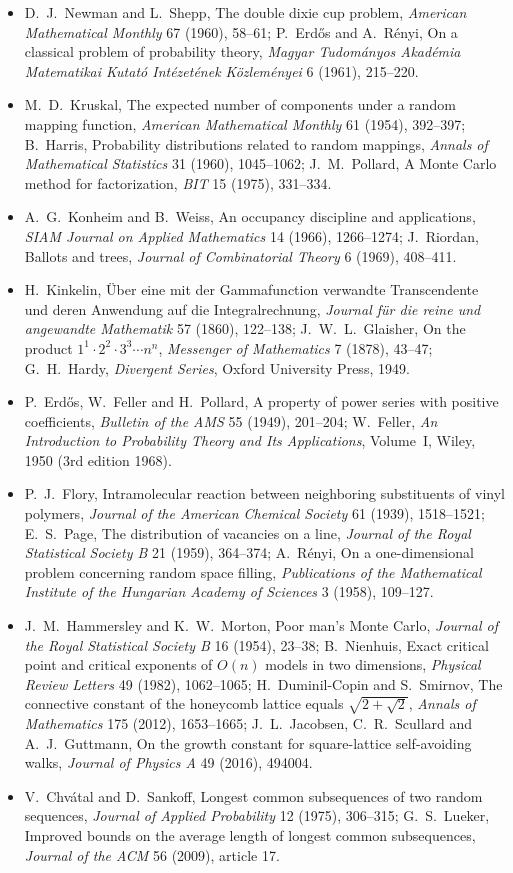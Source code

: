 \begin{itemize}
\item D.~J.~Newman and L.~Shepp, The double dixie cup problem, \emph{American Mathematical Monthly} 67 (1960), 58--61; P.~Erd\H os and A.~R\'enyi, On a classical problem of probability
theory, \emph{Magyar Tudom\'anyos Akad\'emia Matematikai Kutat\'o Int\'ezet\'enek K\"ozlem\'enyei} 6 (1961), 215--220.
\item M.~D.~Kruskal, The expected number of components under a random mapping function, \emph{American Mathematical Monthly} 61 (1954), 392--397; B.~Harris, Probability distributions
related to random mappings, \emph{Annals of Mathematical Statistics} 31 (1960), 1045--1062; J.~M.~Pollard, A Monte Carlo method for factorization, \emph{BIT} 15 (1975), 331--334.
\item A.~G.~Konheim and B.~Weiss, An occupancy discipline and applications, \emph{SIAM Journal on Applied Mathematics} 14 (1966), 1266--1274; J.~Riordan, Ballots and trees, \emph{Journal of
Combinatorial Theory} 6 (1969), 408--411.
\item H.~Kinkelin, \"Uber eine mit der Gammafunction verwandte Transcendente und deren Anwendung auf die Integralrechnung, \emph{Journal f\"ur die reine und angewandte Mathematik} 57
(1860), 122--138; J.~W.~L.~Glaisher, On the product $1^1\cdot2^2\cdot3^3\cdots n^n$, \emph{Messenger of Mathematics} 7 (1878), 43--47; G.~H.~Hardy, \emph{Divergent Series}, Oxford University Press,
1949.
\item P.~Erd\H os, W.~Feller and H.~Pollard, A property of power series with positive coefficients, \emph{Bulletin of the AMS} 55 (1949), 201--204; W.~Feller, \emph{An Introduction to
Probability Theory and Its Applications}, Volume~I, Wiley, 1950 (3rd edition 1968).
\item P.~J.~Flory, Intramolecular reaction between neighboring substituents of vinyl polymers, \emph{Journal of the American Chemical Society} 61 (1939), 1518--1521; E.~S.~Page, The
distribution of vacancies on a line, \emph{Journal of the Royal Statistical Society B} 21 (1959), 364--374; A.~R\'enyi, On a one-dimensional problem concerning random space filling,
\emph{Publications of the Mathematical Institute of the Hungarian Academy of Sciences} 3 (1958), 109--127.
\item J.~M.~Hammersley and K.~W.~Morton, Poor man's Monte Carlo, \emph{Journal of the Royal Statistical Society B} 16 (1954), 23--38; B.~Nienhuis, Exact critical point and critical
exponents of $O(n)$ models in two dimensions, \emph{Physical Review Letters} 49 (1982), 1062--1065; H.~Duminil-Copin and S.~Smirnov, The connective constant of the honeycomb lattice
equals $\sqrt{2+\sqrt2}$, \emph{Annals of Mathematics} 175 (2012), 1653--1665; J.~L.~Jacobsen, C.~R.~Scullard and A.~J.~Guttmann, On the growth constant for square-lattice self-avoiding
walks, \emph{Journal of Physics A} 49 (2016), 494004.
\item V.~Chv\'atal and D.~Sankoff, Longest common subsequences of two random sequences, \emph{Journal of Applied Probability} 12 (1975), 306--315; G.~S.~Lueker, Improved bounds on the
average length of longest common subsequences, \emph{Journal of the ACM} 56 (2009), article 17.
\end{itemize}

